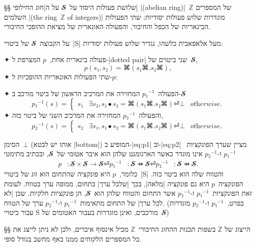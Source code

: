 
§§ שלושת פעולות היסוד על~$𝓢$
על ה\ע|חוג החילופי| \E|(abelian ring)|~$ℤ$ של המספרים השלמים \E|(the ring~$ℤ$
of integers)| מוגדרות שלוש פעולות יסודיות: שתי הפעולות הבינאריות של הכפל
והחיבור, והפעולה האונארית של מציאת ההופכי החיבורי. 

על הקבוצה~$𝓢$ של ביטויי~\E|S| מעל אלאפאבית כלשהו, נגדיר שלוש פעולות יסודיות:
\begin{enumerate}
  ✦ פעולה בינארית אחת,~$p$ המצרפת ל-\E|dotted pair| שני ביטוים של~$𝓢$,
  \begin{equation}
    p(s₁,s₂)=⌘(s₁⌘.s₂⌘),
  \end{equation}
  ✦ שתי הפעולות האונאריות ההופכיות ל-$p$:
  \begin{enumerate}
    ✦ הפעולה~$p₁^{-1}$ המחזירה את המרכיב הראשון של ביטוי מורכב ב-$𝓢$
    \begin{equation}\label{eq:p1}
      p₁^{-1}(s)=\begin{cases}
        s₁ & ∃ s₂, s₁ ∙ s₂=⌘(s₁⌘.s₂⌘) ⏎
        ⊥  & \textit{otherwise}.
      \end{cases}
    \end{equation}
    ✦ והפעולה~$p₂^{-1}$ המחזירה את המרכיב השני של ביטוי כזה,
    \begin{equation}\label{eq:p2}
      p₂^{-1}(s)=\begin{cases}
        s₂ & ∃ s₁, s₁ ∙ s₂=⌘(s₁⌘.s₂⌘) ⏎
        ⊥  & \textit{otherwise}.
      \end{cases}
    \end{equation}
  \end{enumerate}
\end{enumerate}
הסימן~$⊥$ (אותו יש לבטא \E|bottom|) המופיע ב-|eq:p1| וב-|eq:p2|
מציין שערך הפונקציות~$p₁^{-1}$ ו-$p₂^{-1}$ אינו מוגדר כאשר הארגומנט שלהן הוא
איבר אטומי של~$𝓢$, ובכתיב מתימטי
\begin{equation}
  \begin{split}
    p&:𝓢×𝓢→𝓢⏎
    p₁^{-1}&:𝓢 ⇸𝓢⏎
    p₂^{-1}&:𝓢 ⇸𝓢.
  \end{split}
\end{equation}
כלומר,~$p$ היא פונקציה שהתחום הוא זוג של ביטויי~\E|S| והטווח שלה הוא ביטוי כזה.
הפונקציה~$p$ היא גם פונקציה \ע|מלאה|, בכך \ע|שלכל ערך| בתחום, ממופה ערך בטווח.
לעומת זאת הפונקציות~$p₁^{-1}$ ו-$p₂^{-1}$ אשר התחום והטווח שלהן הוא~$𝓢$, הן
פונקציות חלקיות. שכן \ע|לא לכל ערך| של התחום מתאימות~$p₁^{-1}$ ו-$p₂^{-1}$ ערך
של הטווח. (בפרט,~$p₁^{-1}$ ו-$p₂^{-1}$ מוגדרות עבור ביטויי S מורכבים, ואינן
מוגדרות בעבור האטומים של~$𝓢$)

§§ הייצוג של $\mathbb Z$ בשפות תכנות 
ההחוג החיבורי~$ℤ$ מכיל אינסוף איברים, ולכן לא ניתן לייצג את כל המספרים הלקוחים
ממנו באף מחשב בגודל סופי. 

